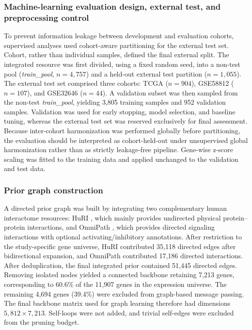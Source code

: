 \documentclass[unnumsec,webpdf,modern,large]{oup-authoring-template}
\begin{document}
\subsubsection{Machine-learning evaluation design, external test, and preprocessing control}
To prevent information leakage between development and evaluation cohorts, supervised analyses used cohort-aware partitioning for the external test set. Cohort, rather than individual samples, defined the final external split. The integrated resource was first divided, using a fixed random seed, into a non-test pool (\emph{train\_pool}, \(n=4{,}757\)) and a held-out external test partition (\(n=1{,}055\)). The external test set comprised three cohorts: TCGA (\(n=904\)), GSE58812 (\(n=107\)), and GSE32646 (\(n=44\)). A validation subset was then sampled from the non-test \emph{train\_pool}, yielding 3,805 training samples and 952 validation samples. Validation was used for early stopping, model selection, and baseline tuning, whereas the external test set was reserved exclusively for final assessment. Because inter-cohort harmonization was performed globally before partitioning, the evaluation should be interpreted as cohort-held-out under unsupervised global harmonization rather than as strictly leakage-free pipeline. Gene-wise z-score scaling was fitted to the training data and applied unchanged to the validation and test data. 

\subsubsection{Prior graph construction}
A directed prior graph was built by integrating two complementary human interactome resources: HuRI \citep{Luck2020HuRI}, which mainly provides undirected physical protein--protein interactions, and OmniPath \citep{Turei2016OmniPath}, which provides directed signaling interactions with optional activating/inhibitory annotations. After restriction to the study-specific gene universe, HuRI contributed 35,118 directed edges after bidirectional expansion, and OmniPath contributed 17,186 directed interactions. After deduplication, the final integrated prior contained 51,445 directed edges. Removing isolated nodes yielded a connected backbone retaining 7,213 genes, corresponding to 60.6\% of the 11,907 genes in the expression universe. The remaining 4,694 genes (39.4\%) were excluded from graph-based message passing. The final backbone matrix used for graph learning therefore had dimensions \(5,812 \times 7,213\). Self-loops were not added, and trivial self-edges were excluded from the pruning budget.
\end{document}
